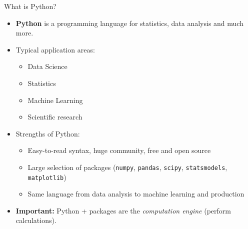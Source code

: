 \documentclass[aspectratio=169,11pt]{beamer}
\begin{document}
\begin{frame}{What is Python?}
\begin{itemize}
    \item \textbf{Python} is a programming language for statistics, data analysis and much more.

    \vspace{0.3cm}

    \item Typical application areas:
    \begin{itemize}
        \item Data Science
        \item Statistics
        \item Machine Learning
        \item Scientific research
    \end{itemize}

    \vspace{0.3cm}

    \item Strengths of Python:
    \begin{itemize}
        \item Easy-to-read syntax, huge community, free and open source
        \item Large selection of packages (\texttt{numpy}, \texttt{pandas},
              \texttt{scipy}, \texttt{statsmodels}, \texttt{matplotlib})
        \item Same language from data analysis to machine learning and production
    \end{itemize}

    \vspace{0.3cm}

    \item \textbf{Important:} Python + packages are the \textit{computation engine} (perform calculations).
\end{itemize}
\end{frame}
\end{document}
